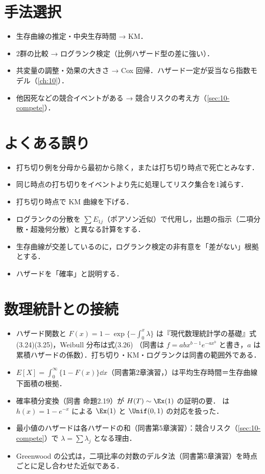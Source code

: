 \section{手法選択}\label{sec:09-choice}
\begin{itemize}
\item 生存曲線の推定・中央生存時間 → KM．
\item 2群の比較 → ログランク検定（比例ハザード型の差に強い）．
\item 共変量の調整・効果の大きさ → Cox 回帰．ハザード一定が妥当なら指数モデル（\cref{ch:10}）．
\item 他因死などの競合イベントがある → 競合リスクの考え方（\cref{sec:10-compete}）．
\end{itemize}

\section{よくある誤り}\label{sec:09-err}
\begin{warnbox}
\begin{itemize}
\item 打ち切り例を分母から最初から除く，または打ち切り時点で死亡とみなす．
\item 同じ時点の打ち切りをイベントより先に処理してリスク集合を1減らす．
\item 打ち切り時点で KM 曲線を下げる．
\item ログランクの分散を $\sum E_{1j}$（ポアソン近似）で代用し，出題の指示（二項分散・超幾何分散）と異なる計算をする．
\item 生存曲線が交差しているのに，ログランク検定の非有意を「差がない」根拠とする．
\item ハザードを「確率」と説明する．
\end{itemize}
\end{warnbox}

\section{数理統計との接続}\label{sec:09-link}
\begin{linkbox}
\begin{itemize}
\item ハザード関数と $F(x)=1-\exp\{-\int_0^x\lambda\}$ は『現代数理統計学の基礎』式(3.24)(3.25)，Weibull 分布は式(3.26)
      （同書は $f=abx^{b-1}e^{-ax^b}$ と書き，$a$ は累積ハザードの係数）．打ち切り・KM・ログランクは同書の範囲外である．
\item $E[X]=\int_0^\infty\{1-F(x)\}\dd x$（同書第2章演習，）は平均生存時間＝生存曲線下面積の根拠．
\item 確率積分変換（同書 命題2.19）が $H(T)\sim\Ex(1)$ の証明の要． は $h(x)=1-e^{-x}$ による $\Ex(1)$ と $\Unif(0,1)$ の対応を扱った．
\item 最小値のハザードは各ハザードの和（同書第5章演習）：競合リスク（\cref{sec:10-compete}）で $\lambda=\sum\lambda_j$ となる理由．
\item Greenwood の公式は，二項比率の対数のデルタ法（同書第5章演習）を時点ごとに足し合わせた近似である．
\end{itemize}
\end{linkbox}

